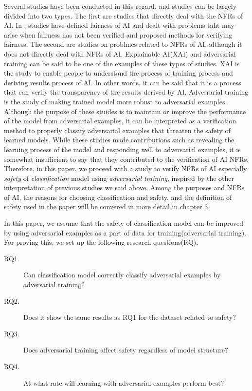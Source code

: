 \documentclass[journal,article,submit,moreauthors,pdftex]{Definitions/mdpi}
\begin{document}
Several studies have been conducted in this regard, and studies can be largely divided into two types.
The first are studies that directly deal with the NFRs of AI.
In \cite{fairness-dwork, fairness-dwork, fairness-feldman, fairness-tramer, fairness-zhang, fairness-zemel, security-mei, security-mei2, security-barreno, safety-amodei, safety-juric,safety-leike, transparency-yosinski}, studies have defined fairness of AI and dealt with problems taht may arise when fairness has not been verified and proposed methods for verifying fairness.
The second are studies on problmes related to NFRs of AI, although it does not directly deal with NFRs of AI.
Explainable AI(XAI) and adversarial training can be said to be one of the examples of these types of studies.
XAI is the study to enable people to understand the process of training process and deriving results process of AI. %
In other words, it can be said that it is a process that can verify the transparency of the results derived by AI.
Advesrarial training is the study of making trained model more robust to adversarial examples.
Although the purpose of these stuides is to maintain or improve the performance of the model from adversarial examples, it can be interpreted as a verification method to properly classify adversarial examples that threaten the safety of learned models.
While these studies made contributions such as revealing the learning process of the model and responding well to adversarial examples, it is somewhat insufficient to say that they contributed to the verification of AI NFRs.
Therefore, in this paper, we proceed with a study to verify NFRs of AI especially \textit{safety} of \textit{classification} model using \textit{adversarial training}, inspired by the other interpretation of previous studies we said above.
Among the purposes and NFRs of AI, the reasons for choosing classification and safety, and the definition of safety used in the paper will be convered in more detail in chapter 3.

In this paper, we assume that the safety of classification model can be improved by using adversarial examples as a part of data for training(adversarial training).
For proving this, we set up the following research questions(RQ).

\begin{description}
    \item[RQ1.]	Can classification model correctly classify adversarial examples by adversarial training?
    \item[RQ2.]	Does it show the same results as RQ1 for the dataset related to safety?
    \item[RQ3.] Does adversarial training affect safety regardless of model structure?
    \item[RQ4.]	At what rate will learning with adversarial examples perform best?
\end{description}
\end{document}
